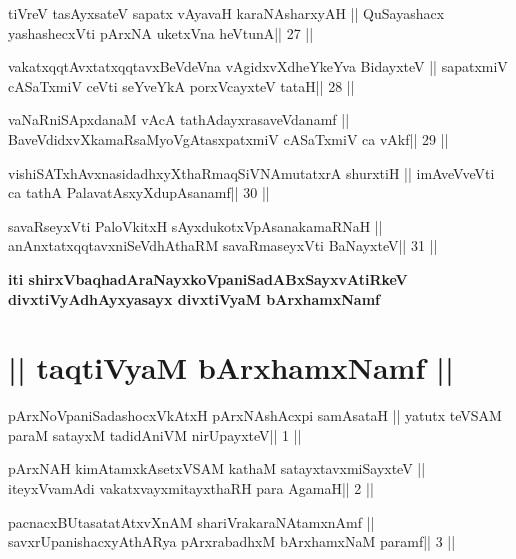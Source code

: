 \begin{shl}
tiVreV tasAyx\s\s sateV sapatx vAyavaH karaNAsharxyAH ||
QuSayashacx yashashecxVti pArxNA uketxVna heVtunA\hfill || 27 ||
\end{shl}

\begin{shl}
vakatxqqtAvxtatxqqtavxBeVdeVna vAgidxvXdheYkeYva BidayxteV ||
sapatxmiV cASaTxmiV ceVti seYveYkA porxVcayxteV tataH\hfill || 28 ||
\end{shl}

\begin{shl}
vaNaRniSApxdanaM vAcA tathA\s\s dayxrasaveVdanamf ||
BaveVdidxvXkamaRsaMyoVgAtasxpatxmiV cASaTxmiV ca vAkf\hfill || 29 ||
\end{shl}

\begin{shl}
vishiSATxhAvxnasidadhxyXthaRmaqSiVNAmutatxrA shurxtiH ||
imAveVveVti ca tathA PalavatAsxyXdupAsanamf\hfill || 30 ||
\end{shl}

\begin{shl}
savaRseyxVti PaloVkitxH sAyxdukotxVpAsanakamaRNaH ||
anAnxtatxqqtavxniSeVdhAthaRM savaRmaseyxVti BaNayxteV\hfill || 31 ||
\end{shl}

\begin{center}
{\bf iti shirxVbaqhadAraNayxkoVpaniSadABxSayxvAtiRkeV\\ 
divxtiVyAdhAyxyasayx divxtiVyaM bArxhamxNamf}
\end{center}

\section{|| taqtiVyaM bArxhamxNamf  ||}

\begin{shl}
pArxNoVpaniSadashocxVkAtxH pArxNAshAcxpi samAsataH ||
yatutx teVSAM paraM satayxM tadidAniVM nirUpayxteV\hfill || 1 ||
\end{shl}

\begin{shl}
pArxNAH kimAtamxkAsetxVSAM kathaM satayxtavxmiSayxteV ||
iteyxVvamAdi vakatxvayxmitayxthaRH para AgamaH\hfill || 2 ||
\end{shl}

\begin{shl}
pacnacxBUtasatatAtxvXnAM shariVrakaraNAtamxnAmf ||
savxrUpanishacxyAthARya pArxrabadhxM bArxhamxNaM paramf\hfill || 3 ||
\end{shl}

